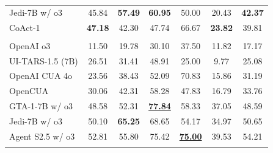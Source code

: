 \documentclass{article} %
\newcommand{\ours}{CoAct-1\xspace}
\newcommand{\best}[1]{\underline{#1}}
\begin{document}
\begin{table}[t]
{\begin{tabular}{lccccccccccc}
Jedi-7B w/ o3              & \multicolumn{3}{c}{45.84}           & \multicolumn{3}{c}{\textbf{57.49}} & \multicolumn{2}{c}{\textbf{60.95}}        & 50.00          & 20.43                  & \textbf{42.37}                    \\\rowcolor[HTML]{DBFCDA}
\ours                    & \multicolumn{3}{c}{\textbf{47.18}}  & \multicolumn{3}{c}{42.30}          & \multicolumn{2}{c}{47.74}                 & 66.67 & \textbf{23.82}         & 39.81                             \\\rowcolor{gray!15}
\multicolumn{12}{c}{\textit{50 步}}                                                                                                                                                                                                   \\
OpenAI o3                  & \multicolumn{3}{c}{11.50}           & \multicolumn{3}{c}{19.78}          & \multicolumn{2}{c}{30.10}                 & 37.50          & 11.82                  & 17.17                             \\
UI-TARS-1.5 (7B)             & \multicolumn{3}{c}{26.51}           & \multicolumn{3}{c}{31.41}          & \multicolumn{2}{c}{48.91}                 & 25.00          & 9.77                  & 25.08                            \\
OpenAI CUA 4o              & \multicolumn{3}{c}{23.56}           & \multicolumn{3}{c}{38.43}          & \multicolumn{2}{c}{52.09}                 & 70.83          & 15.86                  & 31.19                             \\
OpenCUA              & \multicolumn{3}{c}{30.06}           & \multicolumn{3}{c}{42.31}          & \multicolumn{2}{c}{58.28}                 & 47.83          & 16.79                  & 33.76                             \\
GTA-1-7B w/ o3             & \multicolumn{3}{c}{48.58}           & \multicolumn{3}{c}{52.31}          & \multicolumn{2}{c}{\textbf{\best{77.84}}}        & 58.33          & 37.05                  & 48.59                             \\
Jedi-7B w/ o3              & \multicolumn{3}{c}{50.10}           & \multicolumn{3}{c}{\textbf{65.25}}          & \multicolumn{2}{c}{68.65}                 & 54.17          & 34.97                  & 50.65                             \\
Agent S2.5 w/ o3           & \multicolumn{3}{c}{52.81}           & \multicolumn{3}{c}{55.80}          & \multicolumn{2}{c}{75.42}                 & \textbf{\best{75.00}} & 39.53                  & 54.21                             \\\rowcolor[HTML]{DBFCDA}

\end{tabular}}
\end{table}
\end{document}

